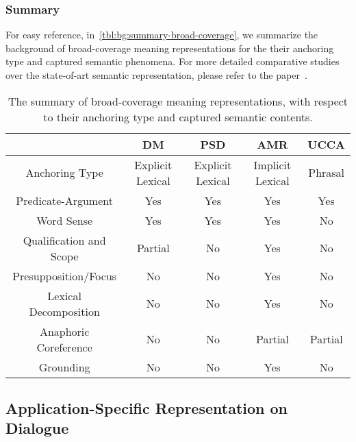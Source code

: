 \subsubsection{Summary}
\label{ssec:bg:summary-broad-coverage}

For easy reference, in~\autoref{tbl:bg:summary-broad-coverage}, we
summarize the background of broad-coverage meaning representations for
the their anchoring type and captured semantic phenomena. For more
detailed comparative studies over the state-of-art semantic
representation, please refer to the paper~\citep{abend2017state}.

\begin{table}[!tbp]
\caption{The summary of broad-coverage meaning representations, with respect to their anchoring type and captured semantic contents.}
  \begin{center}
\setlength{\tabcolsep}{3pt}
{
\begin{tabular}{c|cccc}
  \toprule
  \hline
  & {\bf DM}               & {\bf PSD}              & {\bf AMR}              & {\bf UCCA}    \\ \hline
  Anchoring Type          & Explicit Lexical & Explicit Lexical & Implicit Lexical & Phrasal \\ \hline
  Predicate-Argument      & Yes              & Yes              & Yes              & Yes     \\
  Word Sense              & Yes              & Yes              & Yes              & No      \\
  Qualification and Scope & Partial          & No               & Yes              & No      \\
  Presupposition/Focus    & No               & No               & Yes              & No      \\
  Lexical Decomposition   & No               & No               & Yes              & No      \\
  Anaphoric Coreference   & No               & No               & Partial          & Partial \\
  Grounding               & No               & No               & Yes              & No \\ \hline
  \bottomrule

\end{tabular}}
\end{center}
\label{tbl:bg:summary-broad-coverage}
\end{table}


\subsection{Application-Specific Representation on Dialogue}
\label{ssec:bg:dialogue-mr}

